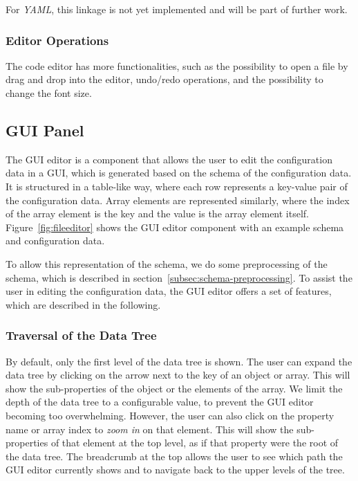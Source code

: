 For \textit{YAML}, this linkage is not yet implemented and will be part of further work.

\subsubsection{Editor Operations}
The code editor has more functionalities, such as the possibility to open a file by drag and drop into the editor,
undo/redo operations, and the possibility to change the font size.

\subsection{GUI Panel}\label{subsec:gui-editor}

The GUI editor is a component that allows the user to edit the configuration data in a GUI,
which is generated based on the schema of the configuration data.
It is structured in a table-like way, where each row represents a key-value pair of the configuration data.
Array elements are represented similarly, where the index of the array element is the key and the value is the array element itself.
Figure~\ref{fig:fileeditor} shows the GUI editor component with an example schema and configuration data.


To allow this representation of the schema, we do some preprocessing of the schema,
which is described in section~\ref{subsec:schema-preprocessing}.
To assist the user in editing the configuration data, the GUI editor offers a set of features, which are described in the following.

\subsubsection{Traversal of the Data Tree}
By default, only the first level of the data tree is shown.
The user can expand the data tree by clicking on the arrow next to the key of an object or array.
This will show the sub-properties of the object or the elements of the array.
We limit the depth of the data tree to a configurable value, to prevent the GUI editor becoming too overwhelming.
However, the user can also click on the property name or array index to \textit{zoom in} on that element.
This will show the sub-properties of that element at the top level, as if that property were the root of the data tree.
The breadcrumb at the top allows the user to see which path the GUI editor currently shows and to navigate back to the upper levels of the tree.


